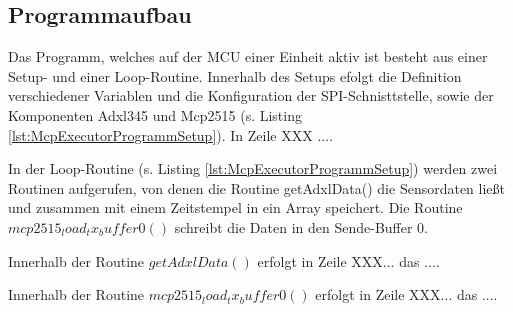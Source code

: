 \subsection{Programmaufbau}
\label{kap:McpExecutorProgrammaufbau}
Das Programm, welches auf der MCU einer Einheit aktiv ist besteht aus einer Setup- und einer Loop-Routine. Innerhalb des Setups efolgt die Definition verschiedener Variablen und die Konfiguration der SPI-Schnisttstelle, sowie der Komponenten Adxl345 und Mcp2515 (s. Listing \ref{lst:McpExecutorProgrammSetup}).
In Zeile XXX ....


In der Loop-Routine  (s. Listing \ref{lst:McpExecutorProgrammSetup}) werden zwei Routinen aufgerufen, von denen die Routine getAdxlData() die Sensordaten ließt und zusammen mit einem Zeitstempel in ein Array speichert.
Die Routine $mcp2515_load_tx_buffer0()$ schreibt die Daten in den Sende-Buffer 0.


Innerhalb der Routine $getAdxlData()$ erfolgt in Zeile XXX... das ....


Innerhalb der Routine $mcp2515_load_tx_buffer0()$ erfolgt in Zeile XXX... das ....

